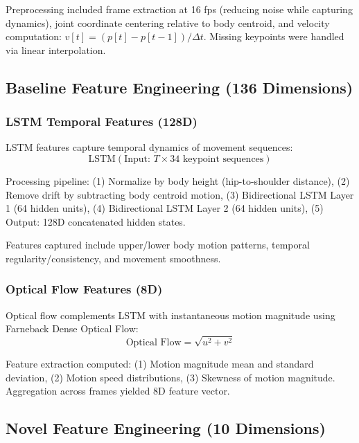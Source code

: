 \documentclass[conference]{IEEEtran}
\begin{document}
Preprocessing included frame extraction at 16 fps (reducing noise while capturing dynamics), joint coordinate centering relative to body centroid, and velocity computation: $v[t] = (p[t] - p[t-1]) / \Delta t$. Missing keypoints were handled via linear interpolation.

\subsection{Baseline Feature Engineering (136 Dimensions)}

\subsubsection{LSTM Temporal Features (128D)}

LSTM features capture temporal dynamics of movement sequences:
\begin{equation}
\text{LSTM}(\text{Input: } T \times 34 \text{ keypoint sequences})
\end{equation}

Processing pipeline: (1) Normalize by body height (hip-to-shoulder distance), (2) Remove drift by subtracting body centroid motion, (3) Bidirectional LSTM Layer 1 (64 hidden units), (4) Bidirectional LSTM Layer 2 (64 hidden units), (5) Output: 128D concatenated hidden states.

Features captured include upper/lower body motion patterns, temporal regularity/consistency, and movement smoothness.

\subsubsection{Optical Flow Features (8D)}

Optical flow complements LSTM with instantaneous motion magnitude using Farneback Dense Optical Flow:
\begin{equation}
\text{Optical Flow} = \sqrt{u^2 + v^2}
\end{equation}

Feature extraction computed: (1) Motion magnitude mean and standard deviation, (2) Motion speed distributions, (3) Skewness of motion magnitude. Aggregation across frames yielded 8D feature vector.

\subsection{Novel Feature Engineering (10 Dimensions)}
\end{document}
